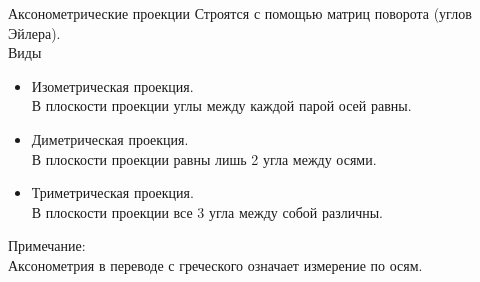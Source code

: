 \documentclass{beamer}
\begin{document}
	\begin{frame}{Аксонометрические проекции}
		Строятся с помощью матриц поворота (углов Эйлера).
		\\ Виды
		\begin{itemize}
			\item Изометрическая проекция. \\
			В плоскости проекции углы между каждой парой осей равны.
			\item Диметрическая проекция. \\
			В плоскости проекции равны лишь 2 угла между осями.
			\item Триметрическая проекция. \\
			В плоскости проекции все 3 угла между собой различны.
		\end{itemize}
		
		Примечание: \\
		Аксонометрия в переводе с греческого означает измерение по осям.
	
\end{frame}
\end{document}
